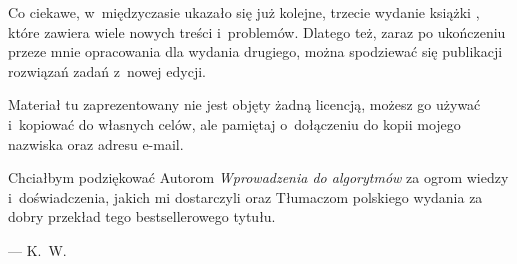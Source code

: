 Co ciekawe, w~międzyczasie ukazało się już kolejne, trzecie wydanie książki \cite{cormen3}, które zawiera wiele nowych treści i~problemów. Dlatego też, zaraz po ukończeniu przeze mnie opracowania dla wydania drugiego, można spodziewać się publikacji rozwiązań zadań z~nowej edycji.

Materiał tu zaprezentowany nie jest objęty żadną licencją, możesz go używać i~kopiować do własnych celów, ale pamiętaj o~dołączeniu do kopii mojego nazwiska oraz adresu e-mail.

Chciałbym podziękować Autorom \textsl{Wprowadzenia do algorytmów} za ogrom wiedzy i~doświadczenia, jakich mi dostarczyli oraz Tłumaczom polskiego wydania za dobry przekład tego bestsellerowego tytułu.

\bigskip
{}\hfill--- K.~W.

\endinput
